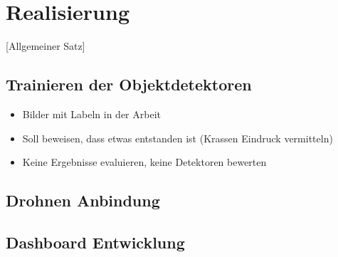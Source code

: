 \chapter{Realisierung}

[Allgemeiner Satz]

\section{Trainieren der Objektdetektoren}

\begin{itemize}
	\item Bilder mit Labeln in der Arbeit
	\item Soll beweisen, dass etwas entstanden ist (Krassen Eindruck vermitteln)
	\item Keine Ergebnisse evaluieren, keine Detektoren bewerten
\end{itemize}

\section{Drohnen Anbindung}

\section{Dashboard Entwicklung}
